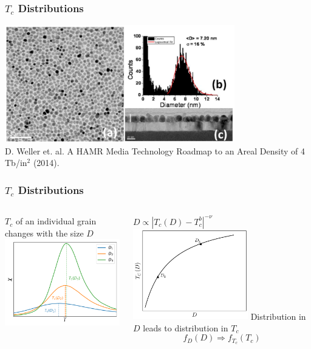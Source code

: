 \documentclass{beamer}
\begin{document}
\begin{frame}
	\frametitle{$T_c$ Distributions}
	\centering
	\includegraphics[width=10cm]{Images/roadmap_grains} \\
	\tiny D. Weller et. al. A HAMR Media Technology Roadmap to an Areal Density of 4 Tb/in$^2$ (2014).
\end{frame}

\begin{frame}
	\frametitle{$T_c$ Distributions}
	\begin{columns}
		\column{6cm}
		\begin{center}
			$T_c$ of an individual grain changes with the size $D$ \\ \vspace{4mm}
			\includegraphics[width=5cm]{Images/suscept}
		\end{center}
		\column{6cm}
		\begin{center}
			$D \propto |T_c(D)-T_c^b|^{-\nu}$ \\ \vspace{3mm}
			\includegraphics[width=5cm]{Images/TcD}
			\vspace{4mm}
			Distribution in $D$ leads to distribution in $T_c$
			$$
			f_D(D) \Longrightarrow f_{T_c}(T_c)
			$$
		\end{center}
	\end{columns}
\end{frame}
\end{document}

